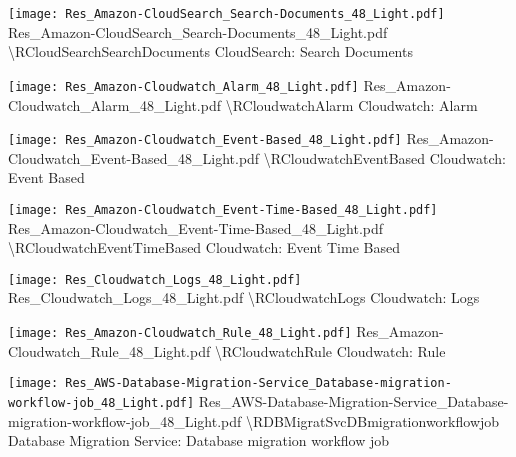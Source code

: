  {\texttt{[image: Res\_Amazon-CloudSearch\_Search-Documents\_48\_Light.pdf]}} {Res\_Amazon-CloudSearch\_Search-Documents\_48\_Light.pdf} {{\textbackslash}RCloudSearchSearchDocuments} {CloudSearch: Search Documents}

 {\texttt{[image: Res\_Amazon-Cloudwatch\_Alarm\_48\_Light.pdf]}} {Res\_Amazon-Cloudwatch\_Alarm\_48\_Light.pdf} {{\textbackslash}RCloudwatchAlarm} {Cloudwatch: Alarm}

 {\texttt{[image: Res\_Amazon-Cloudwatch\_Event-Based\_48\_Light.pdf]}} {Res\_Amazon-Cloudwatch\_Event-Based\_48\_Light.pdf} {{\textbackslash}RCloudwatchEventBased} {Cloudwatch: Event Based}

 {\texttt{[image: Res\_Amazon-Cloudwatch\_Event-Time-Based\_48\_Light.pdf]}} {Res\_Amazon-Cloudwatch\_Event-Time-Based\_48\_Light.pdf} {{\textbackslash}RCloudwatchEventTimeBased} {Cloudwatch: Event Time Based}

 {\texttt{[image: Res\_Cloudwatch\_Logs\_48\_Light.pdf]}} {Res\_Cloudwatch\_Logs\_48\_Light.pdf} {{\textbackslash}RCloudwatchLogs} {Cloudwatch: Logs}

 {\texttt{[image: Res\_Amazon-Cloudwatch\_Rule\_48\_Light.pdf]}} {Res\_Amazon-Cloudwatch\_Rule\_48\_Light.pdf} {{\textbackslash}RCloudwatchRule} {Cloudwatch: Rule}

 {\texttt{[image: Res\_AWS-Database-Migration-Service\_Database-migration-workflow-job\_48\_Light.pdf]}} {Res\_AWS-Database-Migration-Service\_Database-migration-workflow-job\_48\_Light.pdf} {{\textbackslash}RDBMigratSvcDBmigrationworkflowjob} {Database Migration Service: Database migration workflow job}

